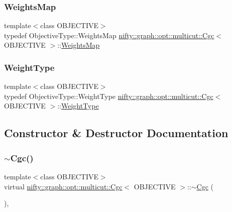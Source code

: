 \subsubsection{\texorpdfstring{Weights\+Map}{WeightsMap}}
{\footnotesize\ttfamily template$<$class O\+B\+J\+E\+C\+T\+I\+VE$>$ \\
typedef Objective\+Type\+::\+Weights\+Map \hyperlink{classnifty_1_1graph_1_1opt_1_1multicut_1_1Cgc}{nifty\+::graph\+::opt\+::multicut\+::\+Cgc}$<$ O\+B\+J\+E\+C\+T\+I\+VE $>$\+::\hyperlink{classnifty_1_1graph_1_1opt_1_1multicut_1_1Cgc_aa8c539cff0d978f8688f362d304a6565}{Weights\+Map}}

\mbox{\label{classnifty_1_1graph_1_1opt_1_1multicut_1_1Cgc_af53c2aba41be6fa0cb8eebe36535c7f2}} 
\subsubsection{\texorpdfstring{Weight\+Type}{WeightType}}
{\footnotesize\ttfamily template$<$class O\+B\+J\+E\+C\+T\+I\+VE$>$ \\
typedef Objective\+Type\+::\+Weight\+Type \hyperlink{classnifty_1_1graph_1_1opt_1_1multicut_1_1Cgc}{nifty\+::graph\+::opt\+::multicut\+::\+Cgc}$<$ O\+B\+J\+E\+C\+T\+I\+VE $>$\+::\hyperlink{classnifty_1_1graph_1_1opt_1_1multicut_1_1Cgc_af53c2aba41be6fa0cb8eebe36535c7f2}{Weight\+Type}}



\subsection{Constructor \& Destructor Documentation}
\mbox{\label{classnifty_1_1graph_1_1opt_1_1multicut_1_1Cgc_aa3f06e4557d83941c8278b14225185cb}} 
\subsubsection{\texorpdfstring{$\sim$\+Cgc()}{~Cgc()}}
{\footnotesize\ttfamily template$<$class O\+B\+J\+E\+C\+T\+I\+VE$>$ \\
virtual \hyperlink{classnifty_1_1graph_1_1opt_1_1multicut_1_1Cgc}{nifty\+::graph\+::opt\+::multicut\+::\+Cgc}$<$ O\+B\+J\+E\+C\+T\+I\+VE $>$\+::$\sim$\hyperlink{classnifty_1_1graph_1_1opt_1_1multicut_1_1Cgc}{Cgc} (\begin{DoxyParamCaption}{ }\end{DoxyParamCaption})\hspace{0.3cm}{\ttfamily [inline]}, {\ttfamily [virtual]}}

